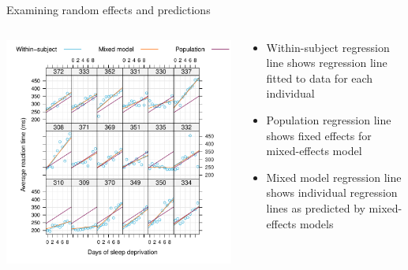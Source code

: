 \documentclass[aspectratio=169]{beamer}
\begin{document}
\begin{frame}{Examining random effects and predictions}
  \begin{columns}
    \begin{column}{.5\textwidth}
      \includegraphics[scale=.5]{../figures/sleep_shrinkfit}
    \end{column}
    \begin{column}{.5\textwidth}
      \begin{itemize}
        \item Within-subject regression line shows regression line fitted to
          data for each individual
        \item Population regression line shows fixed effects for mixed-effects
          model
        \item Mixed model regression line shows individual regression lines as
          predicted by mixed-effects models
      \end{itemize}
    \end{column}
  \end{columns}
\end{frame}
\end{document}
